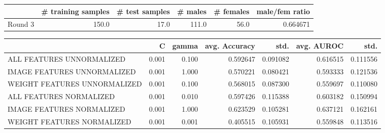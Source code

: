 \begin{tabular}{lrrrrr}
\hline
{} &  \# training samples &  \# test samples &  \# males &  \# females &  male/fem ratio \\
\hline
Round 3 &               150.0 &            17.0 &    111.0 &       56.0 &        0.664671 \\
\hline
\end{tabular}
\begin{tabular}{lrrrrrr}
\hline
{} &      C &  gamma &  avg. Accuracy &      std. &  avg. AUROC &      std. \\
\hline
ALL FEATURES UNNORMALIZED    &  0.001 &  0.100 &       0.592647 &  0.091082 &    0.616515 &  0.111556 \\
IMAGE FEATURES UNNORMALIZED  &  0.001 &  1.000 &       0.570221 &  0.080421 &    0.593333 &  0.121536 \\
WEIGHT FEATURES UNNORMALIZED &  0.001 &  0.100 &       0.568015 &  0.087300 &    0.559697 &  0.110080 \\
ALL FEATURES NORMALIZED      &  0.001 &  0.010 &       0.597426 &  0.115388 &    0.603182 &  0.150994 \\
IMAGE FEATURES NORMALIZED    &  0.001 &  1.000 &       0.623529 &  0.105281 &    0.637121 &  0.162161 \\
WEIGHT FEATURES NORMALIZED   &  0.001 &  0.001 &       0.405515 &  0.105931 &    0.559848 &  0.113516 \\
\hline
\end{tabular}
